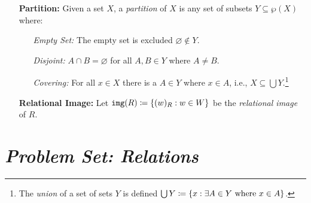 \documentclass[a4paper, 11pt]{article} %
\begin{document}
\begin{enumerate}[leftmargin=1.2in]
  \item[\bf Partition:] Given a set $X$, a \textit{partition} of $X$ is any set of subsets $Y \subseteq \wp(X)$ where:
    \begin{itemize}
      \item[\it Empty Set:] The empty set is excluded $\varnothing \notin Y$.
      \item[\it Disjoint:] $A \cap B = \varnothing$ for all $A, B \in Y$ where $A \neq B$. 
      \item[\it Covering:] For all $x \in X$ there is a $A \in Y$ where $x \in A$, i.e., $X \subseteq \bigcup Y$.\footnote{The \textit{union} of a set of sets $Y$ is defined $\bigcup Y \coloneq \lbrace x : \exists A \in Y \text{ where } x \in A\rbrace$.}
    \end{itemize}
  \item[\bf Relational Image:] Let $\mathtt{img}(R) \coloneq \lbrace(w)_R : w \in W\rbrace$ be the \textit{relational image} of $R$.
\end{enumerate}





\section*{\it Problem Set: Relations}
\end{document}
